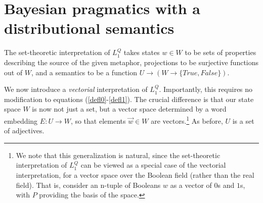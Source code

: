 \documentclass[OpenMind]{stjour}
\newcommand{\Listener}{L}
\newcommand{\QLONE}{\Listener_{{1}}^{{Q}}}
\begin{document}



\section{Bayesian pragmatics with a distributional semantics} \label{bayesdist}

	The set-theoretic interpretation of $\QLONE$ takes states $w \in W$ to be sets of properties describing the source of the given metaphor, projections to be surjective functions out of $W$, and a semantics to be a function $U\to(W\to\{True, False\})$.

	We now introduce a \emph{vectorial} interpretation of $\QLONE$. Importantly, this requires no modification to equations (\ref{defl0}-\ref{defl1}). The crucial difference is that our state space $W$ is now not just a set, but a vector space determined by a word embedding $E : U\to W$, so that elements $\overrightarrow{w}\in W$ are vectors.\footnote{We note that this generalization is natural, since the set-theoretic interpretation of $\QLONE$ can be viewed as a special case of the vectorial interpretation, for a vector space over the Boolean field (rather than the real field). That is, consider an n-tuple of Booleans $w$ as a vector of $0$s and $1$s, with $P$ providing the basis of the space.} As before, $U$ is a set of adjectives. 
\end{document}
